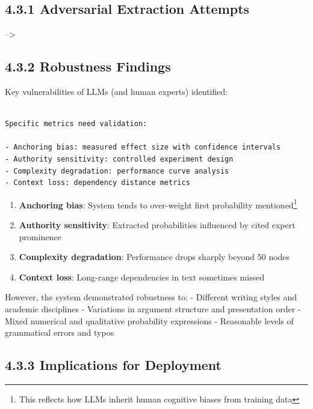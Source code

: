 \documentclass[
  11pt,
  letterpaper,
]{book}
\providecommand{\tightlist}{%
  \setlength{\itemsep}{0pt}\setlength{\parskip}{0pt}}
\begin{document}
\subsection*{4.3.1 Adversarial Extraction
Attempts}\label{sec-adversarial-extraction}

--\textgreater{}

\subsection*{4.3.2 Robustness Findings}\label{sec-robustness-findings}

Key vulnerabilities of LLMs (and human experts) identified:

\begin{verbatim}

Specific metrics need validation:

- Anchoring bias: measured effect size with confidence intervals
- Authority sensitivity: controlled experiment design
- Complexity degradation: performance curve analysis
- Context loss: dependency distance metrics
\end{verbatim}

\begin{enumerate}
\def\labelenumi{\arabic{enumi}.}
\tightlist
\item
  \textbf{Anchoring bias}: System tends to over-weight first probability
  mentioned\footnote{This reflects how LLMs inherit human cognitive
    biases from training data}
\item
  \textbf{Authority sensitivity}: Extracted probabilities influenced by
  cited expert prominence
\item
  \textbf{Complexity degradation}: Performance drops sharply beyond 50
  nodes
\item
  \textbf{Context loss}: Long-range dependencies in text sometimes
  missed
\end{enumerate}

However, the system demonstrated robustness to: - Different writing
styles and academic disciplines - Variations in argument structure and
presentation order - Mixed numerical and qualitative probability
expressions - Reasonable levels of grammatical errors and typos

\subsection*{4.3.3 Implications for
Deployment}\label{sec-deployment-implications}
\end{document}
